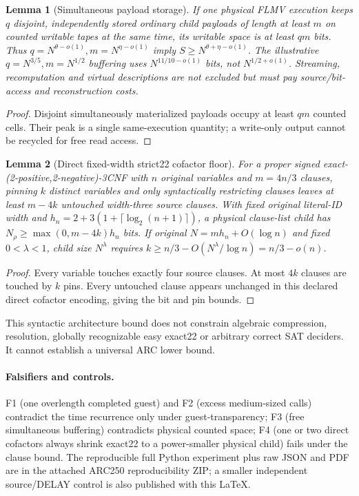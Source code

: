 \documentclass{article}
\newtheorem{lemma}{Lemma}
\begin{document}
\begin{lemma}[Simultaneous payload storage]
If one physical FLMV execution keeps \(q\) disjoint, independently stored ordinary child payloads of length at least \(m\) on counted writable tapes at the same time, its writable space is at least \(qm\) bits. Thus \(q=N^{\theta-o(1)},m=N^{\eta-o(1)}\) imply \(S\ge N^{\theta+\eta-o(1)}\). The illustrative \(q=N^{3/5},m=N^{1/2}\) buffering uses \(N^{11/10-o(1)}\) bits, not \(N^{1/2+o(1)}\). Streaming, recomputation and virtual descriptions are not excluded but must pay source/bit-access and reconstruction costs.
\end{lemma}
\begin{proof}Disjoint simultaneously materialized payloads occupy at least \(qm\) counted cells. Their peak is a single same-execution quantity; a write-only output cannot be recycled for free read access.\end{proof}

\begin{lemma}[Direct fixed-width strict22 cofactor floor]
For a proper signed exact-(2-positive,2-negative)-3CNF with \(n\) original variables and \(m=4n/3\) clauses, pinning \(k\) distinct variables and \emph{only} syntactically restricting clauses leaves at least \(m-4k\) untouched width-three source clauses. With fixed original literal-ID width and \(h_n=2+3(1+\lceil\log_2(n+1)\rceil)\), a physical clause-list child has \(N_\rho\ge\max(0,m-4k)h_n\) bits. If original \(N=mh_n+O(\log n)\) and fixed \(0<\lambda<1\), child size \(N^\lambda\) requires \(k\ge n/3-O(N^\lambda/\log n)=n/3-o(n)\).
\end{lemma}
\begin{proof}Every variable touches exactly four source clauses. At most \(4k\) clauses are touched by \(k\) pins. Every untouched clause appears unchanged in this declared direct cofactor encoding, giving the bit and pin bounds.\end{proof}
\noindent This syntactic architecture bound does not constrain algebraic compression, resolution, globally recognizable easy exact22 or arbitrary correct SAT deciders. It cannot establish a universal ARC lower bound.

\paragraph{Falsifiers and controls.}
F1 (one overlength completed guest) and F2 (excess medium-sized calls) contradict the time recurrence only under guest-transparency; F3 (free simultaneous buffering) contradicts physical counted space; F4 (one or two direct cofactors always shrink exact22 to a power-smaller physical child) fails under the clause bound. The reproducible full Python experiment plus raw JSON and PDF are in the attached ARC250 reproducibility ZIP; a smaller independent source/DELAY control is also published with this LaTeX.
\end{document}
